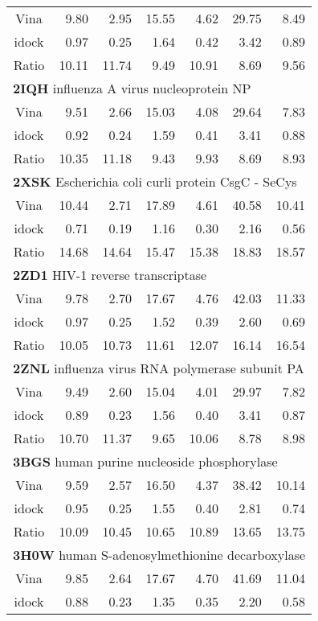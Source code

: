 \documentclass{bioinfo}
\begin{document}
\begin{table}
{\begin{tabular}{crrrrrr}
Vina  &  9.80 &  2.95 & 15.55 &  4.62 & 29.75 &  8.49\\
idock &  0.97 &  0.25 &  1.64 &  0.42 &  3.42 &  0.89\\
Ratio & 10.11 & 11.74 &  9.49 & 10.91 &  8.69 &  9.56\\
\multicolumn{7}{l}{\textbf{2IQH} influenza A virus nucleoprotein NP}\\
Vina  &  9.51 &  2.66 & 15.03 &  4.08 & 29.64 &  7.83\\
idock &  0.92 &  0.24 &  1.59 &  0.41 &  3.41 &  0.88\\
Ratio & 10.35 & 11.18 &  9.43 &  9.93 &  8.69 &  8.93\\
\multicolumn{7}{l}{\textbf{2XSK} Escherichia coli curli protein CsgC - SeCys}\\
Vina  & 10.44 &  2.71 & 17.89 &  4.61 & 40.58 & 10.41\\
idock &  0.71 &  0.19 &  1.16 &  0.30 &  2.16 &  0.56\\
Ratio & 14.68 & 14.64 & 15.47 & 15.38 & 18.83 & 18.57\\
\multicolumn{7}{l}{\textbf{2ZD1} HIV-1 reverse transcriptase}\\
Vina  &  9.78 &  2.70 & 17.67 &  4.76 & 42.03 & 11.33\\
idock &  0.97 &  0.25 &  1.52 &  0.39 &  2.60 &  0.69\\
Ratio & 10.05 & 10.73 & 11.61 & 12.07 & 16.14 & 16.54\\
\multicolumn{7}{l}{\textbf{2ZNL} influenza virus RNA polymerase subunit PA}\\
Vina  &  9.49 &  2.60 & 15.04 &  4.01 & 29.97 &  7.82\\
idock &  0.89 &  0.23 &  1.56 &  0.40 &  3.41 &  0.87\\
Ratio & 10.70 & 11.37 &  9.65 & 10.06 &  8.78 &  8.98\\
\multicolumn{7}{l}{\textbf{3BGS} human purine nucleoside phosphorylase}\\
Vina  &  9.59 &  2.57 & 16.50 &  4.37 & 38.42 & 10.14\\
idock &  0.95 &  0.25 &  1.55 &  0.40 &  2.81 &  0.74\\
Ratio & 10.09 & 10.45 & 10.65 & 10.89 & 13.65 & 13.75\\
\multicolumn{7}{l}{\textbf{3H0W} human S-adenosylmethionine decarboxylase}\\
Vina  &  9.85 &  2.64 & 17.67 &  4.70 & 41.69 & 11.04\\
idock &  0.88 &  0.23 &  1.35 &  0.35 &  2.20 &  0.58\\

\end{tabular}}
\end{table}
\end{document}
